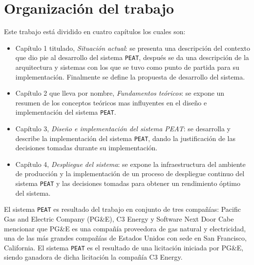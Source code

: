 \section*{Organización del trabajo}

Este trabajo está dividido en cuatro capítulos los cuales son:
\begin{itemize}
\item Capítulo 1 titulado, \textit{Situación actual}: se presenta una descripción
  del contexto que dio pie al desarrollo del sistema \texttt{PEAT}, después se da una
  descripción de la arquitectura y sistemas con los que se tuvo como punto de
  partida para su implementación. Finalmente se define la propuesta de desarrollo
  del sistema.
\item Capítulo 2 que lleva por nombre, \textit{Fundamentos teóricos}: se expone un
  resumen de los conceptos teóricos mas influyentes en el diseño e implementación del
  sistema \texttt{PEAT}.
\item Capítulo 3, \textit{Diseño e implementación del sistema PEAT}: se desarrolla y
  describe la implementación del sistema \texttt{PEAT}, dando la justificación
  de las decisiones tomadas durante su implementación.
\item Capítulo 4, \textit{Despliegue del sistema}: se expone la infraestructura
  del ambiente de producción y la implementación de un proceso de despliegue
  continuo  del sistema \texttt{PEAT} y las decisiones tomadas para obtener un
  rendimiento óptimo del sistema.
\end{itemize}

El sistema \texttt{PEAT} es resultado del trabajo en conjunto de tres compañías:
Pacific Gas and Electric Company (PG\&E), C3 Energy y Software Next Door
Cabe mencionar que PG\&E es una compañía proveedora de gas natural y electricidad, una de las
más grandes compañías de Estados Unidos con sede en San Francisco, California.
El sistema \texttt{PEAT} es el resultado de una licitación iniciada por PG\&E,
siendo ganadora de dicha licitación la compañía C3 Energy.
